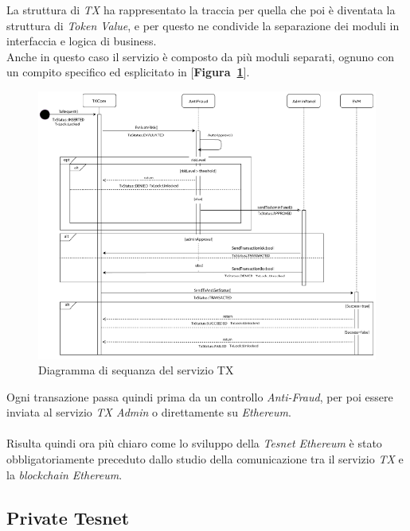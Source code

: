 \documentclass[11pt]{thesistemp}
\begin{document}
La struttura di \textit{TX} ha rappresentato la traccia per quella che poi è diventata la struttura di \textit{Token Value}, e per questo ne condivide la separazione dei moduli in interfaccia e logica di business.\\
Anche in questo caso il servizio è composto da più moduli separati, ognuno con un compito specifico ed esplicitato in [\textbf{Figura~\ref{fig:tx-seq-diag}}].\\
\begin{figure}[h]
    \centering
    \includegraphics[scale=0.55]{tx-seq-diag.png}
        \caption{Diagramma di sequanza del servizio TX}
    \label{fig:tx-seq-diag}
\end{figure}
\linebreak
Ogni transazione passa quindi prima da un controllo \textit{Anti-Fraud}, per poi essere inviata al servizio \textit{TX Admin} o direttamente su \textit{Ethereum}.\\\\
Risulta quindi ora più chiaro come lo sviluppo della \textit{Tesnet Ethereum} è stato obbligatoriamente preceduto dallo studio della comunicazione tra il servizio \textit{TX} e la \textit{blockchain Ethereum}.

\pagebreak

\subsection{Private Tesnet}
\end{document}
